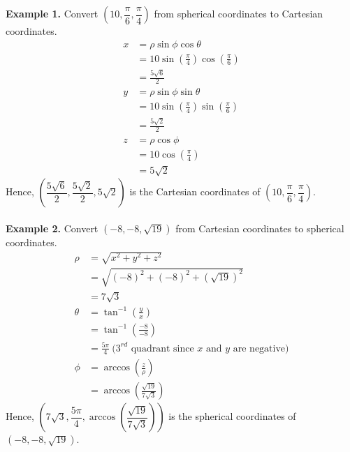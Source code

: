 \documentclass{report}
\begin{document}
\noindent\textbf{Example 1. } Convert $\left(10, \dfrac{\pi}{6}, \dfrac{\pi}{4}\right)$ from spherical coordinates to Cartesian coordinates.
\begin{align*}
    x & = \rho\sin\phi\cos\theta                                         \\
      & = 10\sin\left(\frac{\pi}{4}\right)\cos\left(\frac{\pi}{6}\right) \\
      & = \frac{5\sqrt{6}}{2}                                            \\
    y & = \rho\sin\phi\sin\theta                                         \\
      & = 10\sin\left(\frac{\pi}{4}\right)\sin\left(\frac{\pi}{6}\right) \\
      & = \frac{5\sqrt{2}}{2}                                            \\
    z & = \rho\cos\phi                                                   \\
      & = 10\cos\left(\frac{\pi}{4}\right)                               \\
      & = 5\sqrt{2}
\end{align*}
Hence, $\left(\dfrac{5\sqrt{6}}{2}, \dfrac{5\sqrt{2}}{2}, 5\sqrt{2}\right)$ is the Cartesian coordinates of $\left(10, \dfrac{\pi}{6}, \dfrac{\pi}{4}\right)$.
~\\\\
\noindent\textbf{Example 2. } Convert $\left(-8, -8, \sqrt{19}\right)$ from Cartesian coordinates to spherical coordinates.
\begin{align*}
    \rho   & = \sqrt{x^2 + y^2 + z^2}                                                    \\
           & = \sqrt{(-8)^2 + (-8)^2 + \left(\sqrt{19}\right)^2}                         \\
           & = 7\sqrt{3}                                                                 \\
    \theta & = \tan^{-1}\left(\frac{y}{x}\right)                                         \\
           & = \tan^{-1}\left(\frac{-8}{-8}\right)                                       \\
           & = \frac{5\pi}{4}\ \text{($3^{rd}$ quadrant since $x$ and $y$ are negative)} \\
    \phi   & = \arccos\left(\frac{z}{\rho}\right)                                        \\
           & = \arccos\left(\frac{\sqrt{19}}{7\sqrt{3}}\right)
\end{align*}
Hence, $\left(7\sqrt{3}, \dfrac{5\pi}{4}, \arccos\left(\dfrac{\sqrt{19}}{7\sqrt{3}}\right)\right)$ is the spherical coordinates of $\left(-8, -8, \sqrt{19}\right)$.
\end{document}
